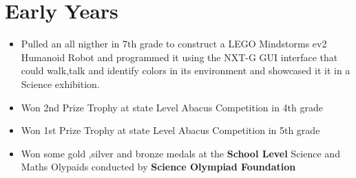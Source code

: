 \documentclass[a4paper,12pt]{article}
\begin{document}
\section*{Early Years}
\begin{itemize}
    \item Pulled an all nigther in 7th grade to construct a LEGO Mindstorms ev2 
    Humanoid Robot and programmed it using the NXT-G GUI interface that could walk,talk 
    and identify colors in its environment and showcased it it in a Science exhibition.
    \item Won 2nd Prize Trophy at state Level Abacus Competition in 4th grade     
    \item Won 1st Prize Trophy at state Level Abacus Competition in 5th grade
    \item Won some gold ,silver and bronze medals at the \textbf{School Level}  Science 
    and Maths Olypaids conducted by \textbf{Science Olympiad Foundation}            
    
\end{itemize}


\end{document}
